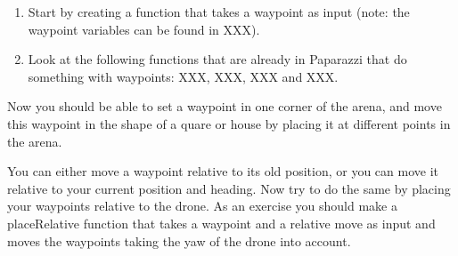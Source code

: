 \documentclass{article}
\begin{document}
\begin{enumerate}
\item Start by creating a function that takes a waypoint as input (note: the waypoint variables can be found in XXX).
\item Look at the following functions that are already in Paparazzi that do something with waypoints: XXX, XXX, XXX and XXX. 
\end{enumerate}

Now you should be able to set a waypoint in one corner of the arena, and move this waypoint in the shape of a quare or house by placing it at different points in the arena.

You can either move a waypoint relative to its old position, or you can move it relative to your current position and heading. Now try to do the same by placing your waypoints relative to the drone. As an exercise you should make a placeRelative function that takes a waypoint and a relative move as input and moves the waypoints taking the yaw of the drone into account. 
\end{document}
